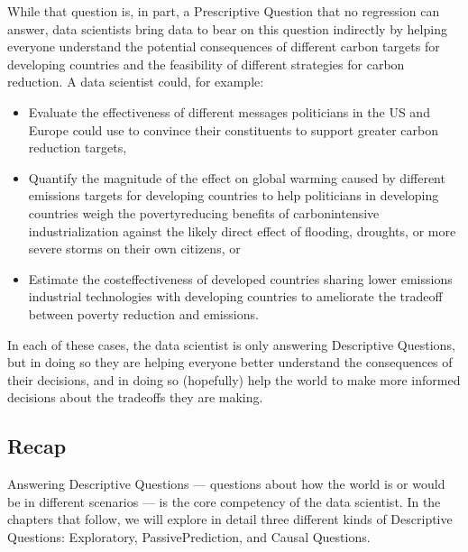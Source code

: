 \documentclass[letterpaper,10pt,english]{jupyterBook}
\begin{document}
\sphinxAtStartPar
While that question is, in part, a Prescriptive Question that no regression can answer, data scientists  bring data to bear on this question indirectly by helping everyone understand the potential consequences of different carbon targets for developing countries and the feasibility of different strategies for carbon reduction. A data scientist could, for example:
\begin{itemize}
\item {} 
\sphinxAtStartPar
Evaluate the effectiveness of different messages politicians in the US and Europe could use to convince their constituents to support greater carbon reduction targets,

\item {} 
\sphinxAtStartPar
Quantify the magnitude of the effect on global warming caused by different emissions targets for developing countries to help politicians in developing countries weigh the poverty\sphinxhyphen{}reducing benefits of carbon\sphinxhyphen{}intensive industrialization against the likely direct effect of flooding, droughts, or more severe storms on their own citizens, or

\item {} 
\sphinxAtStartPar
Estimate the cost\sphinxhyphen{}effectiveness of developed countries sharing lower emissions industrial technologies with developing countries to ameliorate the tradeoff between poverty reduction and emissions.

\end{itemize}

\sphinxAtStartPar
In each of these cases, the data scientist is only answering Descriptive Questions, but in doing so they are helping everyone better understand the consequences of their decisions, and in doing so (hopefully) help the world to make more informed decisions about the trade\sphinxhyphen{}offs they are making.


\subsection{Recap}
\label{\detokenize{30_questions/06_descriptive_prescriptive_examples:recap}}
\sphinxAtStartPar
Answering Descriptive Questions — questions about how the world is or would be in different scenarios — is the core competency of the data scientist. In the chapters that follow, we will explore in detail three different kinds of Descriptive Questions: Exploratory, Passive\sphinxhyphen{}Prediction, and Causal Questions.
\end{document}
